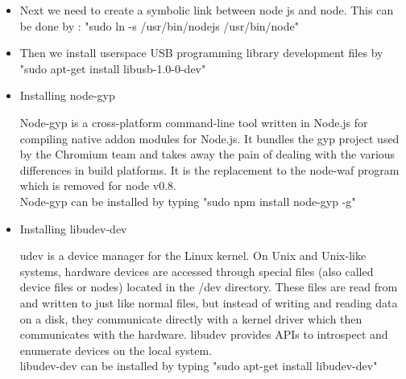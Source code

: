 \documentclass[11pt,a4paper]{article}
\begin{document}
\begin{itemize}
	\item Next we need to create a symbolic link between node js and node. This can be done by : 
	"sudo ln -s /usr/bin/nodejs /usr/bin/node"
	\item Then we install userspace USB programming library development files by \\ "sudo apt-get install libusb-1.0-0-dev"
	\item Installing node-gyp 
	\begin{itemize}
	Node-gyp is a cross-platform command-line tool written in Node.js for compiling native addon modules for Node.js. It bundles the gyp project used by the Chromium team and takes away the pain of dealing with the various differences in build platforms. It is the replacement to the node-waf program which is removed for node v0.8.\\
	Node-gyp can be installed by typing "sudo npm install node-gyp -g"
	\end{itemize}
	\item Installing libudev-dev
	\begin{itemize}
     udev is a device manager for the Linux kernel. On Unix and Unix-like systems, hardware devices are accessed through special files (also called device files or nodes) located in the /dev directory. These files are read from and written to just like normal files, but instead of writing and reading data on a disk, they communicate directly with a kernel driver which then communicates with the hardware. 
     libudev provides APIs to introspect and enumerate devices on the local system.\\
     libudev-dev can be installed by typing "sudo apt-get install libudev-dev"
	\end{itemize}


\end{itemize}
\end{document}

